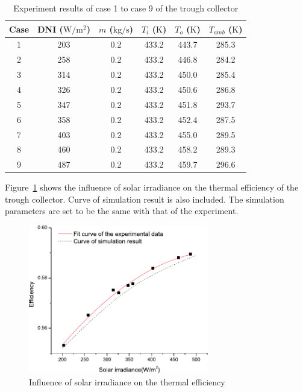 \begin{table}[htbp]\footnotesize
	\caption{Experiment results of case 1 to case 9 of the trough collector}
	\begin{center}
	\begin{tabular}{cccccc}
		\toprule
		Case	& DNI ($\mathrm{W/m^2}$)	&	$\dot{m}$ ($\mathrm{kg/s}$)			&	$T_i$ ($\mathrm{K}$)	&	$T_o$ ($\mathrm{K}$)		&	$T_{amb}$ ($\mathrm{K}$)\\
		\midrule
		1	&	203	&	0.2	&	433.2	&	443.7	&	285.3\\
		2	&	258	&	0.2	&	433.2	&	446.8	&	284.2\\
		3	&	314	&	0.2	&	433.2	&	450.0	&	285.4	\\
		4	&	326	&	0.2	&	433.2	&	450.6	&	286.8\\
		5	&	347	&	0.2	&	433.2	&	451.8	&	293.7\\
		6	&	358	&	0.2	&	433.2	&	452.4	&	287.5\\
		7	&	403	&	0.2	&	433.2	&	455.0	&	289.5\\
		8	&	460	&	0.2	&	433.2	&	458.2	&	289.3\\
		9	&	487	&	0.2	&	433.2	&	459.7	&	296.6\\
		\bottomrule
	\end{tabular}
	\end{center}
	\label{tab:ResultOfTrough1}
\end{table}

Figure~\ref{fig:I_r-eta-trough} shows the influence of solar irradiance on the thermal efficiency of the trough collector. Curve of simulation result is also included. The simulation parameters are set to be the same with that of the experiment. 
\begin{figure}[!ht]
\centering
\includegraphics[width=0.7\textwidth]{fig/I_r-eta-trough}
\caption{Influence of solar irradiance on the thermal efficiency}
\label{fig:I_r-eta-trough}
\end{figure}

